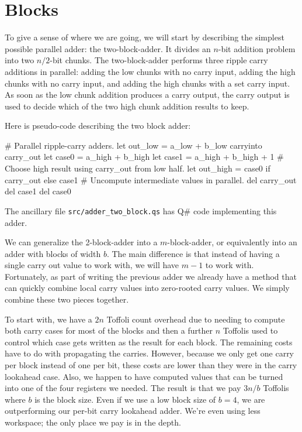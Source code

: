 \documentclass[onecolumn,unpublished]{quantumarticle}
\theoremstyle{definition}
\theoremstyle{definition}
\theoremstyle{definition}
\begin{document}
\section{Blocks}

To give a sense of where we are going, we will start by describing the simplest possible parallel adder: the two-block-adder.
It divides an $n$-bit addition problem into two $n/2$-bit chunks.
The two-block-adder performs three ripple carry additions in parallel: adding the low chunks with no carry input, adding the high chunks with no carry input, and adding the high chunks with a set carry input.
As soon as the low chunk addition produces a carry output, the carry output is used to decide which of the two high chunk addition results to keep.

Here is pseudo-code describing the two block adder:

\begin{python}
    # Parallel ripple-carry adders.
    let out_low = a_low + b_low carryinto carry_out
    let case0 = a_high + b_high
    let case1 = a_high + b_high + 1
    # Choose high result using carry_out from low half.
    let out_high = case0 if carry_out else case1
    # Uncompute intermediate values in parallel.
    del carry_out
    del case1
    del case0
\end{python}

The ancillary file \texttt{src/adder\_two\_block.qs} has Q\# code implementing this adder.

We can generalize the 2-block-adder into a $m$-block-adder, or equivalently into an adder with blocks of width $b$.
The main difference is that instead of having a single carry out value to work with, we will have $m-1$ to work with.
Fortunately, as part of writing the previous adder we already have a method that can quickly combine local carry values into zero-rooted carry values.
We simply combine these two pieces together.

To start with, we have a $2n$ Toffoli count overhead due to needing to compute both carry cases for most of the blocks and then a further $n$ Toffolis used to control which case gets written as the result for each block.
The remaining costs have to do with propagating the carries.
However, because we only get one carry per block instead of one per bit, these costs are lower than they were in the carry lookahead case.
Also, we happen to have computed values that can be turned into one of the four registers we needed.
The result is that we pay $3n/b$ Toffolis where $b$ is the block size.
Even if we use a low block size of $b = 4$, we are outperforming our per-bit carry lookahead adder.
We're even using less workspace; the only place we pay is in the depth.
\end{document}
